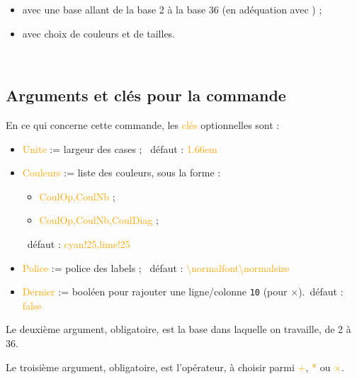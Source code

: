 \documentclass[french,a4paper,11pt]{article}
\newcommand\Cle[1]{{\small\sffamily\textlangle \textcolor{orange}{#1}\textrangle}}
\begin{document}
{{\begin{cautionblock}
\begin{itemize}
	\item avec une base allant de la base 2 à la base 36 (en adéquation avec ) ;
	\item avec choix de couleurs et de tailles.
\end{itemize}
\vspace*{-\baselineskip}\leavevmode
\end{cautionblock}

\begin{DemoCode}
\end{DemoCode}

\begin{DemoCode}[]
~~
\end{DemoCode}

\subsection{Arguments et clés pour la commande}

\begin{tipblock}
En ce qui concerne cette commande, les \Cle{clés} optionnelles sont :

\begin{itemize}
	\item \Cle{Unite} := largeur des cases ; \hfill~défaut : \Cle{1.66em}
	\item \Cle{Couleurs} := liste des couleurs, sous la forme :
	\begin{itemize}
		\item \Cle{CoulOp,CoulNb} ;
		\item \Cle{CoulOp,CoulNb,CoulDiag} ;
	\end{itemize}
	\hfill~défaut : \Cle{cyan!25,lime!25}
	\item \Cle{Police} := police des labels ; \hfill~défaut : \Cle{\textbackslash normalfont\textbackslash  normalsize}
	\item \Cle{Dernier} := booléen pour rajouter une ligne/colonne \texttt{10} (pour $\mathtt{×}$).\hfill~défaut : \Cle{false}
\end{itemize}

Le deuxième argument, obligatoire, est la base dans laquelle on travaille, de 2 à 36.

\smallskip

Le troisième argument, obligatoire, est l'opérateur, à choisir parmi \Cle{+}, \Cle{*} ou \Cle{×}.
\end{tipblock}

}}
\end{document}
